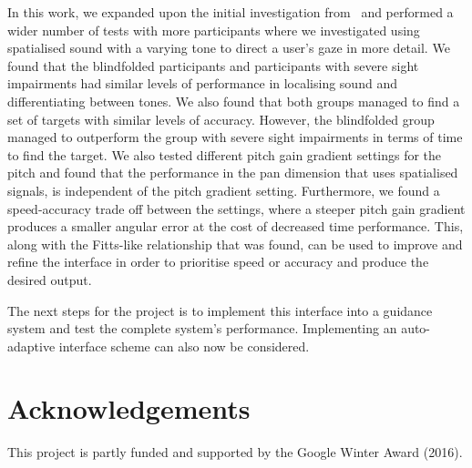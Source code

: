 \documentclass[]{interact}
\begin{document}
In this work, we expanded upon the initial investigation from~\citep{lock2019bone} and performed a wider number of tests with more participants where we investigated using spatialised sound with a varying tone to direct a user's gaze in more detail.
We found that the blindfolded participants and participants with severe sight impairments had similar levels of performance in localising sound and differentiating between tones. 
We also found that both groups managed to find a set of targets with similar levels of accuracy.
However, the blindfolded group managed to outperform the group with severe sight impairments in terms of time to find the target. 
We also tested different pitch gain gradient settings for the pitch and found that the performance in the pan dimension that uses spatialised signals, is independent of the pitch gradient setting.
Furthermore, we found a speed-accuracy trade off between the settings, where a steeper pitch gain gradient produces a smaller angular error at the cost of decreased time performance. 
This, along with the Fitts-like relationship that was found, can be used to improve and refine the interface in order to prioritise speed or accuracy and produce the desired output.

The next steps for the project is to implement this interface into a guidance system and test the complete system's performance. 
Implementing an auto-adaptive interface scheme can also now be considered.

\section*{Acknowledgements}

This project is partly funded and supported by the Google Winter Award (2016).



\end{document}
